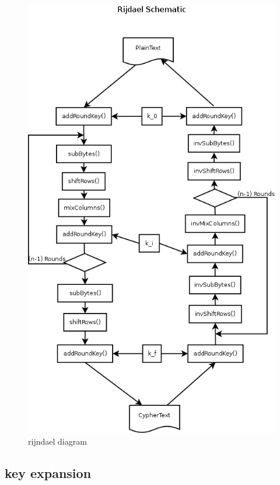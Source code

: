 \documentclass[a4paper,twoside]{llncs}
\begin{document}
\begin{figure}[h]
 \centering
 \includegraphics[scale=0.5,keepaspectratio=true]{./images/rijndaelDiagram.png}
 \caption{rijndael diagram}
 \label{fig:RijndaelDiagram}
\end{figure}


\subsection{key expansion}
\end{document}
